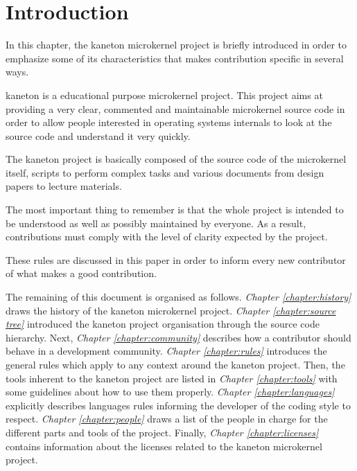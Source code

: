%
%
%
%
%
%

%
%

\chapter{Introduction}
\label{chapter:environment}

In this chapter, the kaneton microkernel project is briefly introduced
in order to emphasize some of its characteristics that makes contribution
specific in several ways.

\newpage

%
%

kaneton is a educational purpose microkernel project. This project aims
at providing a very clear, commented and maintainable microkernel source
code in order to allow people interested in operating systems internals
to look at the source code and understand it very quickly.

The kaneton project is basically composed of the source code of the
microkernel itself, scripts to perform complex tasks and various documents
from design papers to lecture materials.

The most important thing to remember is that the whole project is intended
to be understood as well as possibly maintained by everyone. As a result,
contributions must comply with the level of clarity expected by the project.

These rules are discussed in this paper in order to inform every new
contributor of what makes a good contribution.

The remaining of this document is organised as follows. \textit{Chapter
\ref{chapter:history}} draws the history of the kaneton microkernel project.
\textit{Chapter \ref{chapter:source tree}} introduced the kaneton project
organisation through the source code hierarchy. Next, \textit{Chapter
\ref{chapter:community}} describes how a contributor should behave in a
development community. \textit{Chapter \ref{chapter:rules}} introduces the
general rules which apply to any context around the kaneton project. Then,
the tools inherent to the kaneton project are listed in \textit{Chapter
\ref{chapter:tools}} with some guidelines about how to use them properly.
\textit{Chapter \ref{chapter:languages}} explicitly describes languages rules
informing the developer of the coding style to respect. \textit{Chapter
\ref{chapter:people}} draws a list of the people in charge for the different
parts and tools of the project. Finally, \textit{Chapter
\ref{chapter:licenses}} contains information about the licenses related to
the kaneton microkernel project.
